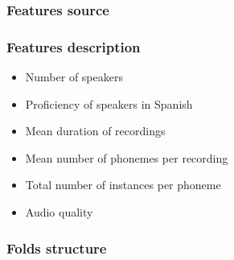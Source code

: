 \subsubsection{Features source}
\subsubsection{Features description}
	\begin{itemize}
		\item Number of speakers
		\item Proficiency of speakers in Spanish
		\item Mean duration of recordings
		\item Mean number of phonemes per recording
		\item Total number of instances per phoneme
		\item Audio quality
	\end{itemize}
\subsubsection{Folds structure}